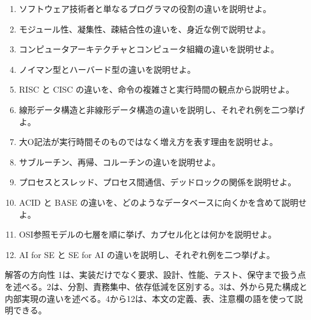 \documentclass[a4paper,11pt]{ltjsarticle}
\begin{document}
\begin{enumerate}[leftmargin=2em]
\item ソフトウェア技術者と単なるプログラマの役割の違いを説明せよ。
\item モジュール性、凝集性、疎結合性の違いを、身近な例で説明せよ。
\item コンピュータアーキテクチャとコンピュータ組織の違いを説明せよ。
\item ノイマン型とハーバード型の違いを説明せよ。
\item RISC と CISC の違いを、命令の複雑さと実行時間の観点から説明せよ。
\item 線形データ構造と非線形データ構造の違いを説明し、それぞれ例を二つ挙げよ。
\item 大O記法が実行時間そのものではなく増え方を表す理由を説明せよ。
\item サブルーチン、再帰、コルーチンの違いを説明せよ。
\item プロセスとスレッド、プロセス間通信、デッドロックの関係を説明せよ。
\item ACID と BASE の違いを、どのようなデータベースに向くかを含めて説明せよ。
\item OSI参照モデルの七層を順に挙げ、カプセル化とは何かを説明せよ。
\item AI for SE と SE for AI の違いを説明し、それぞれ例を二つ挙げよ。
\end{enumerate}

\begin{importantbox}{解答の方向性}
1は、実装だけでなく要求、設計、性能、テスト、保守まで扱う点を述べる。2は、分割、責務集中、依存低減を区別する。3は、外から見た構成と内部実現の違いを述べる。4から12は、本文の定義、表、注意欄の語を使って説明できる。

\end{importantbox}
\end{document}

